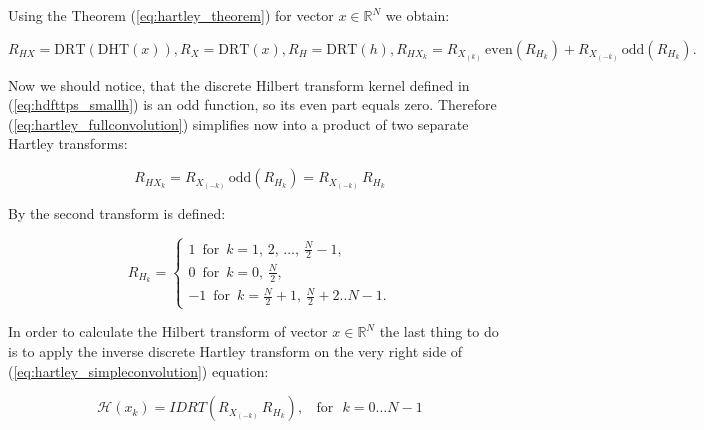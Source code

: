 \documentclass[12pt,twoside,a4paper]{article}
\numberwithin{equation}{subsection}
\numberwithin{figure}{subsection}
\begin{document}
Using the Theorem (\ref{eq:hartley_theorem}) for vector $x \in \mathbb{R} ^ N$ we obtain:

\begin{subequations} \label{eq:hartley_fullconvolution}
	\begin{equation}
		R_{HX} = \mathrm{DRT} \left( \mathrm{DHT}(x) \right) ,
	\end{equation}
	\begin{equation}
		R_{X} =  \mathrm{DRT}(x) ,
	\end{equation}
	\begin{equation}
		R_{H} =  \mathrm{DRT}(h) ,
	\end{equation}
	\begin{equation}
	    R_{HX_k} = R_{X_{(k)}}   \, \mathrm{even}(R_{H_k}) 
	             + R_{X_{(- k)}} \, \mathrm{odd} (R_{H_k}) .
	\end{equation} 
\end{subequations}


Now we should notice, that the discrete Hilbert transform kernel defined in (\ref{eq:hdfttps_smallh}) is an odd function, so its even part equals zero. Therefore (\ref{eq:hartley_fullconvolution}) simplifies now into a product of two separate Hartley transforms:

\begin{equation} \label{eq:hartley_simpleconvolution}
	R_{HX_k} = R_{X_{(- k)}} \, \mathrm{odd}(R_{H_k}) 
	         = R_{X_{(- k)}} \, R_{H_k}
\end{equation}

By \cite{chang_computation} the second transform is defined:

\begin{equation}   \label{eq:hartley_strans}
    R_{H_k} = 
    \begin{cases}
    	1  \, \mbox{ for } \, k = 1, \, 2, \, \ldots, \, \frac {N}{2} - 1 , \\
    	0  \, \mbox{ for } \, k = 0, \, \frac {N}{2} , \\
    	-1 \, \mbox{ for } \, k = \frac {N}{2} + 1, \, \frac {N}{2} + 2 .. N - 1 .
	\end{cases}
\end{equation}

In order to calculate the Hilbert transform of vector $x \in \mathbb{R} ^ N$ the last thing to do is to apply the inverse discrete Hartley transform on the very right side of (\ref{eq:hartley_simpleconvolution}) equation:

\begin{equation} \label{eq:hartley_algorightm_sketch}
  \mathcal{H}(x_k) = IDRT(R_{X_{(- k)}} \, R_{H_k}), \, \, \ \text{ for } \, \, k = 0 \ldots N-1
\end{equation}
\end{document}
